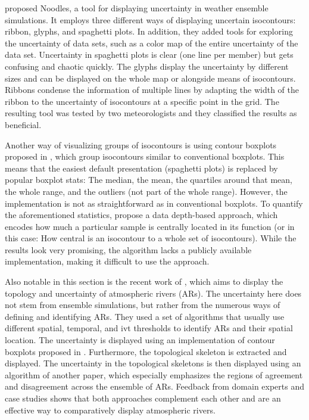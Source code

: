 \citeauthor{sanyal_noodles_2010} proposed Noodles, a tool for displaying uncertainty in weather ensemble simulations. 
It employs three different ways of displaying uncertain isocontours: ribbon, glyphs, and spaghetti plots. 
In addition, they added tools for exploring the uncertainty of data sets, such as a color map of the entire uncertainty of the data set.  
Uncertainty in spaghetti plots is clear (one line per member) but gets confusing and chaotic quickly. 
The glyphs display the uncertainty by different sizes and can be displayed on the whole map or alongside means of isocontours. 
Ribbons condense the information of multiple lines by adapting the width of the ribbon to the uncertainty of isocontours at a specific point in the grid. 
The resulting tool was tested by two meteorologists and they classified the results as beneficial. \cite{sanyal_noodles_2010}


Another way of visualizing groups of isocontours is using contour boxplots proposed in \cite{whitaker_contour_2013}, which group isocontours similar to conventional boxplots. 
This means that the easiest default presentation (spaghetti plots) is replaced by popular boxplot stats: The median, the mean, the quartiles around that mean, the whole range, and the outliers (not part of the whole range). 
However, the implementation is not as straightforward as in conventional boxplots. 
To quantify the aforementioned statistics, \citeauthor{whitaker_contour_2013} propose a data depth-based approach, which encodes how much a particular sample is centrally located in its function (or in this case: How central is an isocontour to a whole set of isocontours). 
While the results look very promising, the algorithm lacks a publicly available implementation, making it difficult to use the approach.


Also notable in this section is the recent work of , which aims to display the topology and uncertainty of atmospheric rivers (ARs).
The uncertainty here does not stem from ensemble simulations, but rather from the numerous ways of defining and identifying ARs. 
They used a set of algorithms that usually use different spatial, temporal, and \ac{ivt} thresholds to identify ARs and their spatial location. 
The uncertainty is displayed using an implementation of contour boxplots proposed in \cite{whitaker_contour_2013}.
Furthermore, the topological skeleton is extracted and displayed. 
The uncertainty in the topological skeletons is then displayed using an algorithm of another paper, which especially emphasizes the regions of agreement and disagreement across the ensemble of ARs.
Feedback from domain experts and case studies shows that both approaches complement each other and are an effective way to comparatively display atmospheric rivers. \cite{lan_topological_2024}


